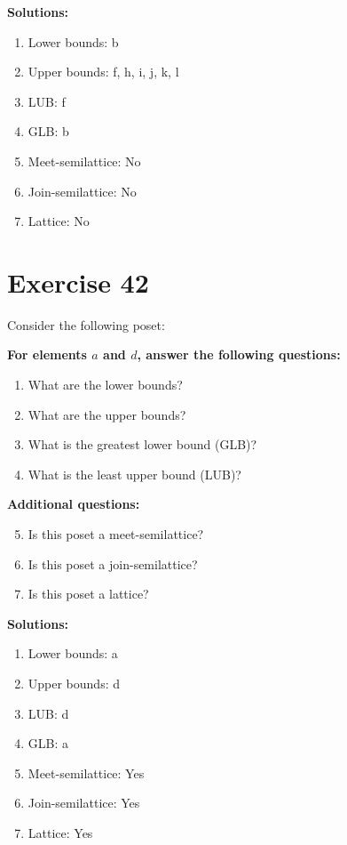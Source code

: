 \documentclass{article}
\begin{document}
\textbf{Solutions:}
\begin{enumerate}
    \item Lower bounds: {b}
    \item Upper bounds: {f, h, i, j, k, l}
    \item LUB: f
    \item GLB: b
    \item Meet-semilattice: No
    \item Join-semilattice: No
    \item Lattice: No
\end{enumerate}
\newpage
\section*{Exercise 42}
Consider the following poset:
\begin{center}
\end{center}

    \textbf{For elements $a$ and $d$, answer the following questions:}
\begin{enumerate}
    \item What are the lower bounds?
    \item What are the upper bounds?
    \item What is the greatest lower bound (GLB)?
    \item What is the least upper bound (LUB)?
\end{enumerate}
    \hspace*{3ex} \textbf{Additional questions:}
\begin{enumerate}
    \setcounter{enumi}{4}
    \item Is this poset a meet-semilattice?
    \item Is this poset a join-semilattice?
    \item Is this poset a lattice?
\end{enumerate}

\textbf{Solutions:}
\begin{enumerate}
    \item Lower bounds: {a}
    \item Upper bounds: {d}
    \item LUB: d
    \item GLB: a
    \item Meet-semilattice: Yes
    \item Join-semilattice: Yes
    \item Lattice: Yes
\end{enumerate}
\newpage
\end{document}

